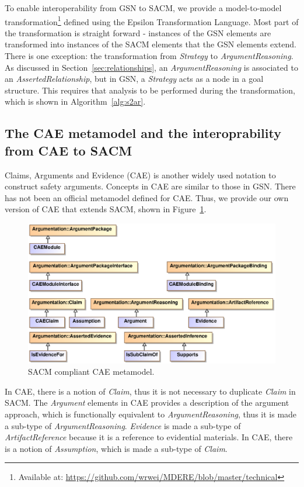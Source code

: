 To enable interoperability from GSN to SACM, we provide a model-to-model transformation\footnote{Available at: \url{https://github.com/wrwei/MDERE/blob/master/technical}} defined using the Epsilon Transformation Language\cite{kolovos2008epsilon}. Most part of the transformation is straight forward - instances of the GSN elements are transformed into instances of the SACM elements that the GSN elements extend. There is one exception: the transformation from \textit{Strategy} to \textit{ArgumentReasoning}. As discussed in Section~\ref{sec:relationships}, an \textit{ArgumentReasoning} is associated to an \textit{AssertedRelationship}, but in GSN, a \textit{Strategy} acts as a node in a goal structure. This requires that analysis to be performed during the transformation, which is shown in Algorithm~\ref{alg:s2ar}.

\subsection{The CAE metamodel and the interoprability from CAE to SACM}
Claims, Arguments and Evidence (CAE) \cite{cae} is another widely used notation to construct safety arguments. Concepts in CAE are similar to those in GSN. There has not been an official metamodel defined for CAE. Thus, we provide our own version of CAE that extends SACM, shown in Figure~\ref{fig:caeMetamodel}.
\begin{figure}
	\centering
	\includegraphics[width=1\linewidth]{CAE.eps}
	\caption{SACM compliant CAE metamodel.}
	\label{fig:caeMetamodel}
\end{figure}

In CAE, there is a notion of \textit{Claim}, thus it is not necessary to duplicate \textit{Claim} in SACM. The \textit{Argument} elements in CAE provides a description of the argument approach, which is functionally equivalent to \textit{ArgumentReasoning}, thus it is made a sub-type of \textit{ArgumentReasoning}. \textit{Evidence} is made a sub-type of \textit{ArtifactReference} because it is a reference to evidential materials. In CAE, there is a notion of \textit{Assumption}, which is made a sub-type of \textit{Claim}. 

